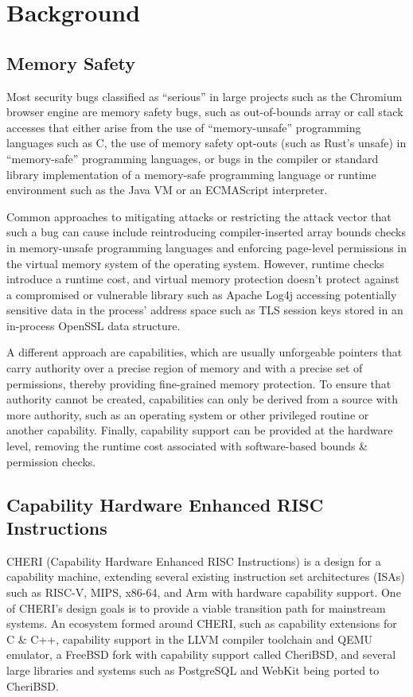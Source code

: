 \documentclass[main.tex]{subfiles}
\begin{document}
\mainmatter

\chapter{Background}

\section{Memory Safety}

Most security bugs classified as “serious” in large projects such as the Chromium browser engine are memory safety bugs, such as out-of-bounds array or call stack accesses that either arise from the use of “memory-unsafe” programming languages such as C, the use of memory safety opt-outs (such as Rust’s unsafe) in “memory-safe” programming languages, or bugs in the compiler or standard library implementation of a memory-safe programming language or runtime environment such as the Java VM or an ECMAScript interpreter.

Common approaches to mitigating attacks or restricting the attack vector that such a bug can cause include reintroducing compiler-inserted array bounds checks in memory-unsafe programming languages and enforcing page-level permissions in the virtual memory system of the operating system. However, runtime checks introduce a runtime cost, and virtual memory protection doesn’t protect against a compromised or vulnerable library such as Apache Log4j accessing potentially sensitive data in the process’ address space such as TLS session keys stored in an in-process OpenSSL data structure.

A different approach are capabilities, which are usually unforgeable pointers that carry authority over a precise region of memory and with a precise set of permissions, thereby providing fine-grained memory protection. To ensure that authority cannot be created, capabilities can only be derived from a source with more authority, such as an operating system or other privileged routine or another capability. Finally, capability support can be provided at the hardware level, removing the runtime cost associated with software-based bounds \& permission checks.

\section{Capability Hardware Enhanced RISC Instructions}
CHERI (Capability Hardware Enhanced RISC Instructions) is a design for a capability machine, extending several existing instruction set architectures (ISAs) such as RISC-V, MIPS, x86-64, and Arm with hardware capability support. One of CHERI’s design goals is to provide a viable transition path for mainstream systems. An ecosystem formed around CHERI, such as capability extensions for C \& C++, capability support in the LLVM compiler toolchain and QEMU emulator, a FreeBSD fork with capability support called CheriBSD, and several large libraries and systems such as PostgreSQL and WebKit being ported to CheriBSD.
\end{document}
